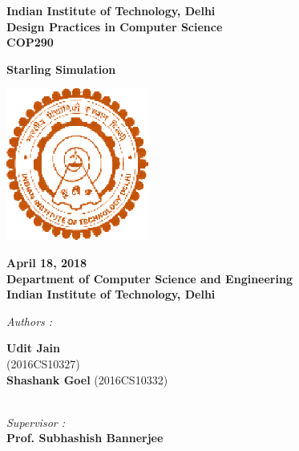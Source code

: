 \documentclass[12pt]{report}
\begin{document}
\begin{center}
\LARGE{\textbf{Indian Institute of Technology, Delhi}}\\
\vspace{0.8cm}
\large{\textbf{Design Practices in Computer Science}}\\[5pt]
\large{\textbf{COP290}}\\[5pt]
\vspace{0.5cm}

\large{\textbf{Starling Simulation }}



\begin{center}
\includegraphics[height=5cm]{iitd.eps}
\end{center}
\vspace{0.2cm}

\textbf{April 18, 2018} \\
\textbf{Department of Computer Science and Engineering} \\
\textbf{Indian Institute of Technology, Delhi}\\


\vspace{1.5cm}


\begin{multicols*}{2}

\begin{flushleft}

\textit{Authors :\\ }


\textbf{Udit Jain} \\
(2016CS10327)\\
\textbf{Shashank Goel}
(2016CS10332)\\

\end{flushleft}


\columnbreak

\begin{flushleft}

\textit{\\Supervisor :\\ }
\textbf{Prof. Subhashish Bannerjee} \\[5pt]

\end{flushleft}

\end{multicols*}

\end{center}
\end{document}
